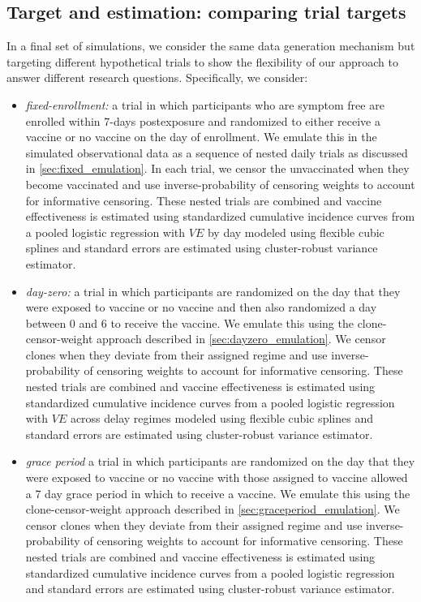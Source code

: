 \begin{appendices}
\begin{refsection}
    \subsection{Target and estimation: comparing trial targets}
    In a final set of simulations, we consider the same data generation mechanism but targeting different hypothetical trials to show the flexibility of our approach to answer different research questions. Specifically, we consider:
    \begin{itemize}
        \item \textit{fixed-enrollment:} a trial in which participants who are symptom free are enrolled within 7-days postexposure and randomized to either receive a vaccine or no vaccine on the day of enrollment. We emulate this in the simulated observational data as a sequence of nested daily trials as discussed in \ref{sec:fixed_emulation}. In each trial, we censor the unvaccinated when they become vaccinated and use inverse-probability of censoring weights to account for informative censoring. These nested trials are combined and vaccine effectiveness is estimated using standardized cumulative incidence curves from a pooled logistic regression with $VE$ by day modeled using flexible cubic splines and standard errors are estimated using cluster-robust variance estimator. 
        \item \textit{day-zero:} a trial in which participants are randomized on the day that they were exposed to vaccine or no vaccine and then also randomized a day between 0 and 6 to receive the vaccine. We emulate this using the clone-censor-weight approach described in \ref{sec:dayzero_emulation}. We censor clones when they deviate from their assigned regime and use inverse-probability of censoring weights to account for informative censoring. These nested trials are combined and vaccine effectiveness is estimated using standardized cumulative incidence curves from a pooled logistic regression  with $VE$ across delay regimes modeled using flexible cubic splines and standard errors are estimated using cluster-robust variance estimator.
        \item \textit{grace period} a trial in which participants are randomized on the day that they were exposed to vaccine or no vaccine with those assigned to vaccine allowed a 7 day grace period in which to receive a vaccine. We emulate this using the clone-censor-weight approach described in \ref{sec:graceperiod_emulation}. We censor clones when they deviate from their assigned regime and use inverse-probability of censoring weights to account for informative censoring. These nested trials are combined and vaccine effectiveness is estimated using standardized cumulative incidence curves from a pooled logistic regression and standard errors are estimated using cluster-robust variance estimator.
    \end{itemize}


\end{refsection}
\end{appendices}
